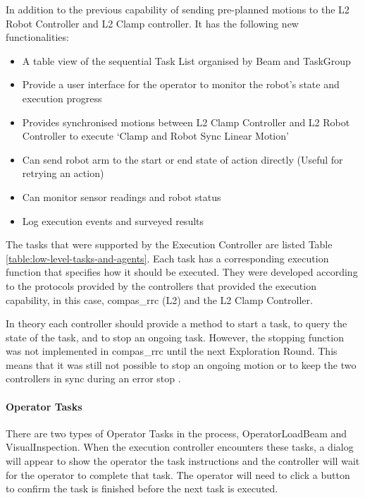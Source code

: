 In addition to the previous capability of sending pre-planned motions to the L2 Robot Controller and L2 Clamp controller. It has the following new functionalities:

\begin{itemize}
	\item A table view of the sequential Task List organised by Beam and TaskGroup

	\item Provide a user interface for the operator to monitor the robot's state and execution progress

	\item Provides synchronised motions between L2 Clamp Controller and L2 Robot Controller to execute ‘Clamp and Robot Sync Linear Motion’

	\item Can send robot arm to the start or end state of action directly (Useful for retrying an action)

	\item Can monitor sensor readings and robot status

	\item Log execution events and surveyed results

\end{itemize}

The tasks that were supported by the Execution Controller are listed Table \ref{table:low-level-tasks-and-agents}. Each task has a corresponding execution function that specifies how it should be executed. They were developed according to the protocols provided by the controllers that provided the execution capability, in this case, compas\_rrc (L2) and the L2 Clamp Controller. 

In theory each controller should provide a method to start a task, to query the state of the task, and to stop an ongoing task. However, the stopping function was not implemented in compas\_rrc until the next Exploration Round. This means that it was still not possible to stop an ongoing motion or to keep the two controllers in sync during an error stop .

\paragraph{Operator Tasks}

There are two types of Operator Tasks in the process, OperatorLoadBeam and VisualInspection. When the execution controller encounters these tasks, a dialog will appear to show the operator the task instructions and the controller will wait for the operator to complete that task. The operator will need to click a button to confirm the task is finished before the next task is executed. 

